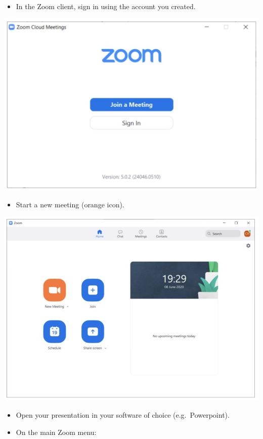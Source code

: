 \documentclass[
  12pt,
]{book}
\providecommand{\tightlist}{%
  \setlength{\itemsep}{0pt}\setlength{\parskip}{0pt}}
\begin{document}
\begin{itemize}
\tightlist
\item
  In the Zoom client, sign in using the account you created.
\end{itemize}

\includegraphics{zoom2.png}

\begin{itemize}
\tightlist
\item
  Start a new meeting (orange icon).
\end{itemize}

\includegraphics{zoom3.png}

\begin{itemize}
\item
  Open your presentation in your software of choice (e.g.~Powerpoint).
\item
  On the main Zoom menu:
\end{itemize}
\end{document}
